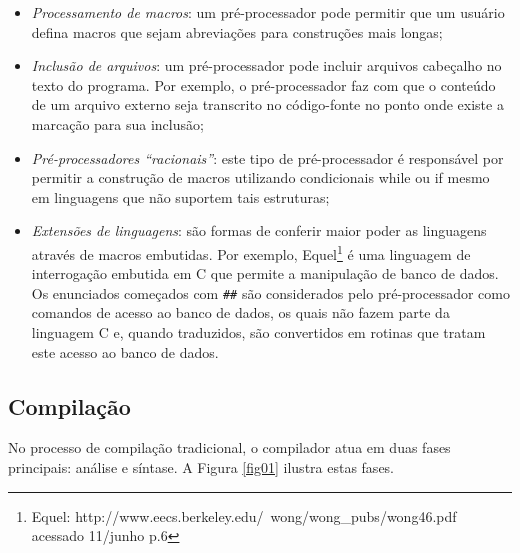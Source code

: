 \begin{itemize}

\item \textit{Processamento de macros}: um pré-processador pode permitir que um usuário 
    defina macros que sejam abreviações para construções mais longas\cite{ref11};

\item \textit{Inclusão de arquivos}: um pré-processador pode incluir arquivos cabeçalho no
     texto do programa. Por exemplo, o pré-processador faz com que o conteúdo de
     um arquivo externo seja transcrito no código-fonte no ponto onde existe a 
    marcação para sua inclusão\cite{ref11};

\item \textit{Pré-processadores “racionais”}: este tipo de pré-processador é responsável 
    por permitir a construção de macros utilizando condicionais while ou if mesmo
     em linguagens que não suportem tais estruturas\cite{ref11};

\item \textit{Extensões de linguagens}: são formas de conferir maior poder as linguagens
     através de macros embutidas. Por exemplo, 
    Equel\footnote{Equel:  http://www.eecs.berkeley.edu/~wong/wong\_pubs/wong46.pdf
     acessado 11/junho p.6} é uma linguagem de 
    interrogação embutida em C que permite a manipulação de banco de dados. 
    Os enunciados começados com \texttt{\#\#} são considerados pelo pré-processador como
     comandos de acesso ao banco de dados, os quais não fazem parte da 
    linguagem C e, quando traduzidos, são convertidos em rotinas que tratam 
    este acesso ao banco de dados\cite{ref11}.

\end{itemize}

\subsection{Compilação}

No processo de compilação tradicional, o compilador atua em duas fases 
principais: análise e síntase\cite{ref12}\cite{ref13}. A Figura \ref{fig01}
 ilustra estas fases. 

